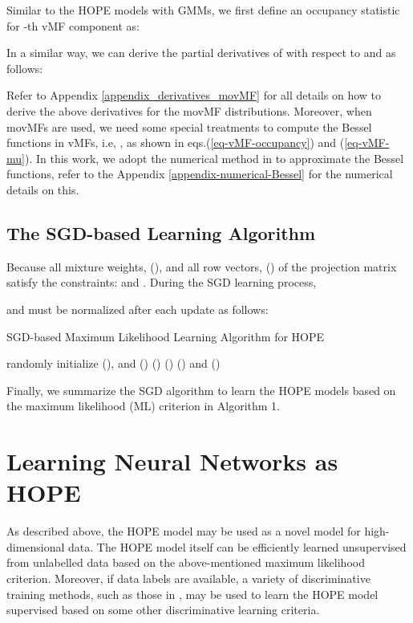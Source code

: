 \documentclass[11pt]{article}
\begin{document}
Similar to the HOPE models with GMMs, we first define an occupancy statistic for -th vMF component as:


In a similar way, we can derive the partial derivatives of  with respect to  and  as follows:


 

 

Refer to Appendix \ref{appendix_derivatives_movMF} for all details on how to derive the above derivatives for the movMF distributions. Moreover, when movMFs are used, we need some special treatments to compute the Bessel functions in vMFs, i.e, , as shown in eqs.(\ref{eq-vMF-occupancy}) and (\ref{eq-vMF-mu}). In this work, we adopt the numerical method in \cite{Abramowitz_1964} to approximate the Bessel functions, refer to the Appendix \ref{appendix-numerical-Bessel} for the numerical details on this. 
 
\subsection{The SGD-based Learning Algorithm}

Because all mixture weights,  (), and all row vectors, 
 () of the projection matrix satisfy the constraints:  and 
 . During the SGD learning process, 
  
and   must be normalized  after each update as follows: 





\begin{algorithm}[tb]  
 \caption{SGD-based Maximum Likelihood Learning Algorithm for HOPE}
\begin{algorithmic} 
\label{algMLEHOPESGD}
   \STATE randomly initialize  (),  and   
 ()
   \STATE    
   \STATE  \; ()
   \STATE   \; ()
  \STATE 
  \STATE  \; ()
 \;\; and \;\;   \; ()
   \ENDFOR
   \ENDFOR
\end{algorithmic} 
\end{algorithm}

Finally, we summarize the SGD algorithm to learn the HOPE models based on the maximum likelihood (ML) criterion in Algorithm 1. 

\section{Learning Neural Networks as HOPE}

As described above, the HOPE model may be used as a novel model for high-dimensional data. The HOPE model itself can be efficiently learned unsupervised from unlabelled data  based on the above-mentioned maximum likelihood criterion. 
Moreover, if data labels are available, a variety of discriminative training methods, such as those in \cite{Jiang2010a,Jiang2010b,Jiang2014}, may be used to learn the HOPE model supervised based on some other discriminative learning criteria.  
\end{document}
